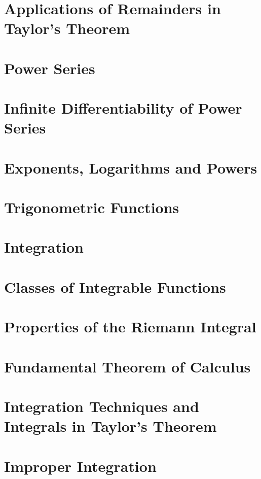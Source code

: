 \documentclass{article}
\begin{document}
\section{Applications of Remainders in Taylor's Theorem}

\section{Power Series}

\section{Infinite Differentiability of Power Series}

\section{Exponents, Logarithms and Powers}

\section{Trigonometric Functions}

\section{Integration}

\section{Classes of Integrable Functions}

\section{Properties of the Riemann Integral}

\section{Fundamental Theorem of Calculus}

\section{Integration Techniques and Integrals in Taylor's Theorem}

\section{Improper Integration}

\end{document}
